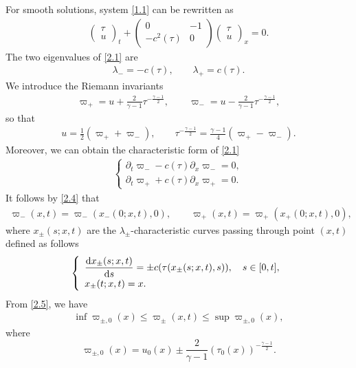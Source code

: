 \documentclass[11pt,reqno]{article}
\newcommand{\dps}{\displaystyle}
\newcommand{\fr}{\frac}
\newcommand{\pa}{\partial}
\numberwithin{equation}{section}
\begin{document}
For smooth solutions, system \eqref{1.1} can be rewritten as
\begin{align}\label{2.1}
\left(
\begin{array}{l}
\tau \\
u
\end{array}
\right)_t +
\left(
\begin{array}{cc}
0  &  -1 \\
-c^2(\tau)  &  0
\end{array}
\right)
\left(
\begin{array}{l}
\tau \\
u
\end{array}
\right)_x=0.
\end{align}
The two eigenvalues of \eqref{2.1} are
\begin{align}\label{2.2}
\lambda_-=-c(\tau),\qquad \lambda_+=c(\tau).
\end{align}
We introduce the Riemann invariants
\begin{align}\label{2.3}
\varpi_+=u+\fr{2}{\gamma-1}\tau^{-\fr{\gamma-1}{2}},\qquad \varpi_-=u-\fr{2}{\gamma-1}\tau^{-\fr{\gamma-1}{2}},
\end{align}
so that
\begin{align}\label{2.3a}
u=\fr{1}{2}(\varpi_++\varpi_-),\qquad \tau^{-\fr{\gamma-1}{2}}=\fr{\gamma-1}{4}(\varpi_+-\varpi_-).
\end{align}
Moreover, we can obtain the characteristic form of \eqref{2.1}
\begin{align}\label{2.4}
\left\{
\begin{array}{l}
\pa_t\varpi_--c(\tau)\pa_x\varpi_-=0, \\
\pa_t\varpi_++c(\tau)\pa_x\varpi_+=0.
\end{array}
\right.
\end{align}
It follows by \eqref{2.4} that
\begin{align}\label{2.5}
\varpi_-(x,t)=\varpi_-(x_-(0;x,t),0),\qquad \varpi_+(x,t)=\varpi_+(x_+(0;x,t),0),
\end{align}
where $x_\pm(s;x,t)$ are the $\lambda_\pm$-characteristic curves passing through point $(x,t)$ defined as follows
\begin{align}\label{2.6}
\left\{
\begin{array}{l}
\dps\fr{{\rm d}x_\pm(s;x,t)}{{\rm d}s}=\pm c(\tau(x_\pm(s;x,t),s)),\quad s\in[0,t], \\[5pt]
x_\pm(t;x,t)=x.
\end{array}
\right.
\end{align}
From \eqref{2.5}, we have
\begin{align}\label{2.7}
\inf \varpi_{\pm,0}(x)\leq \varpi_\pm(x,t) \leq \sup \varpi_{\pm, 0}(x),
\end{align}
where
$$
\varpi_{\pm,0}(x)=u_0(x)\pm \fr{2}{\gamma-1}(\tau_0(x))^{-\fr{\gamma-1}{2}}.
$$
\end{document}
